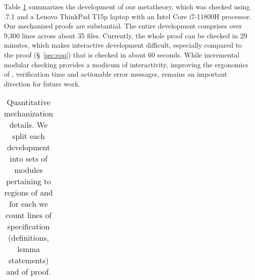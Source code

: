 Table \ref{fig:empirical} summarizes the development 
of our metatheory,
which was checked using .7.1
and a Lenovo ThinkPad T15p laptop with
an Intel Core i7-11800H processor.
%
Our mechanized proofs are substantial. The entire
\lh development comprises over 9,300 lines 
across about 35 files. 
%
Currently, the whole \lh proof can be checked
in 29 minutes, which makes interactive
development difficult, especially compared to 
the \coq proof (\S~\ref{sec:coq}) that 
is checked in about 60 seconds.
%
While incremental modular checking provides
a modicum of interactivity, improving the
ergonomics of \lh, 
\ie verification time and 
actionable error messages, remains an important
direction for future work.

\begin{table}
\caption{Quantitative mechanization details. We split each development into sets of
modules pertaining to regions of  and for each we
count lines of specification (definitions, lemma statements)
and of proof.}
\label{fig:empirical}
\vspace{0.00cm}
\begin{tabular}{l}
\end{tabular}
\end{table}
